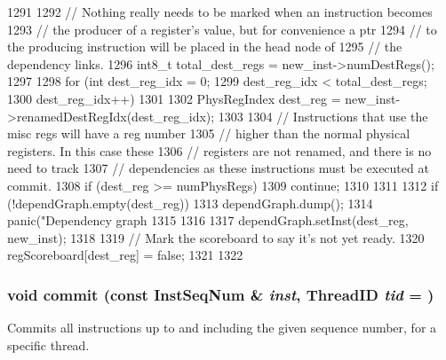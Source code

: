 \begin{DoxyCode}
1291 {
1292     // Nothing really needs to be marked when an instruction becomes
1293     // the producer of a register's value, but for convenience a ptr
1294     // to the producing instruction will be placed in the head node of
1295     // the dependency links.
1296     int8_t total_dest_regs = new_inst->numDestRegs();
1297 
1298     for (int dest_reg_idx = 0;
1299          dest_reg_idx < total_dest_regs;
1300          dest_reg_idx++)
1301     {
1302         PhysRegIndex dest_reg = new_inst->renamedDestRegIdx(dest_reg_idx);
1303 
1304         // Instructions that use the misc regs will have a reg number
1305         // higher than the normal physical registers.  In this case these
1306         // registers are not renamed, and there is no need to track
1307         // dependencies as these instructions must be executed at commit.
1308         if (dest_reg >= numPhysRegs) {
1309             continue;
1310         }
1311 
1312         if (!dependGraph.empty(dest_reg)) {
1313             dependGraph.dump();
1314             panic("Dependency graph %
1315         }
1316 
1317         dependGraph.setInst(dest_reg, new_inst);
1318 
1319         // Mark the scoreboard to say it's not yet ready.
1320         regScoreboard[dest_reg] = false;
1321     }
1322 }
\end{DoxyCode}
\hypertarget{classInstructionQueue_a04f8d2acf3cd0b90a1efc69b528f91bc}{
\subsubsection[{commit}]{\setlength{\rightskip}{0pt plus 5cm}void commit (const {\bf InstSeqNum} \& {\em inst}, \/  {\bf ThreadID} {\em tid} = {})}}
\label{classInstructionQueue_a04f8d2acf3cd0b90a1efc69b528f91bc}
Commits all instructions up to and including the given sequence number, for a specific thread. 


